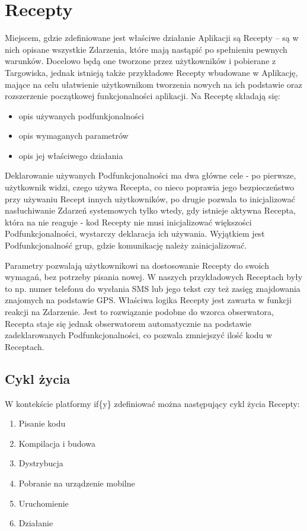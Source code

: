\documentclass[11pt,a4paper,polish,thesis]{dcsbook}
\begin{document}
\section{Recepty}
Miejscem, gdzie zdefiniowane jest właściwe działanie Aplikacji są Recepty -- są w nich opisane wszystkie Zdarzenia, które mają nastąpić po spełnieniu pewnych warunków. Docelowo będą one tworzone przez użytkowników i pobierane z Targowiska, jednak istnieją także przykładowe Recepty wbudowane w Aplikację, mające na celu ułatwienie użytkownikom tworzenia nowych na ich podstawie oraz rozszerzenie początkowej funkcjonalności aplikacji. 
Na Receptę składają się:
\begin{itemize}
\item  opis używanych podfunkjonalności
\item  opis wymaganych parametrów
\item  opis jej właściwego działania
\end{itemize}
Deklarowanie używanych Podfunkcjonalności ma dwa główne cele - po pierwsze, użytkownik widzi, czego używa Recepta, co nieco poprawia jego bezpieczeństwo przy używaniu Recept innych użytkowników, po drugie pozwala to inicjalizować nasłuchiwanie Zdarzeń systemowych tylko wtedy, gdy istnieje aktywna Recepta, która na nie reaguje - kod Recepty nie musi inicjalizować większości Podfunkcjonalności, wystarczy deklaracja ich używania. Wyjątkiem jest Podfunkcjonalność grup, gdzie komunikację należy zainicjalizować.

Parametry pozwalają użytkownikowi na dostosowanie Recepty do swoich wymagań, bez potrzeby pisania nowej. W naszych przykładowych Receptach były to np. numer telefonu do wysłania SMS lub jego tekst czy też zasięg znajdowania znajomych na podstawie GPS.
Właściwa logika Recepty jest zawarta w funkcji reakcji na Zdarzenie. Jest to rozwiązanie podobne do wzorca obserwatora, Recepta staje się jednak obserwatorem automatycznie na podstawie zadeklarowanych Podfunkcjonalności, co pozwala zmniejszyć ilość kodu w Receptach.

\subsection{Cykl życia}
W kontekście platformy if\{y\} zdefiniować można następujący cykl życia Recepty:
\begin{enumerate}
\item Pisanie kodu
\item Kompilacja i budowa
\item Dystrybucja
\item Pobranie na urządzenie mobilne
\item Uruchomienie
\item Działanie
\end{enumerate}
\end{document}
